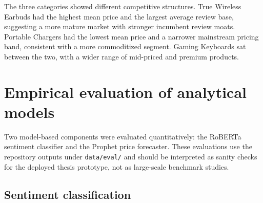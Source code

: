 \begin{table}[H]
  \centering
  \small
  \caption{Descriptive statistics of tracked categories on April 29, 2026. SOV denotes Sponsored Share of Voice, computed as the proportion of sponsored ASINs in the Top-50 snapshot. The uniform 4.0\% value across all three categories is a measurement artifact: the Apify actor flagged exactly two ASINs as sponsored in each Top-50 list ($2/50 = 4.0\%$), which likely under-counts true ad density because the actor captures only the labels visible on the first scrape pass.}
  \label{tab:category_baseline}
\end{table}

The three categories showed different competitive structures. True Wireless Earbuds had the highest mean price and the largest average review base, suggesting a more mature market with stronger incumbent review moats. Portable Chargers had the lowest mean price and a narrower mainstream pricing band, consistent with a more commoditized segment. Gaming Keyboards sat between the two, with a wider range of mid-priced and premium products.

\section{Empirical evaluation of analytical models}

Two model-based components were evaluated quantitatively: the RoBERTa sentiment classifier and the Prophet price forecaster. These evaluations use the repository outputs under \texttt{data/eval/} and should be interpreted as sanity checks for the deployed thesis prototype, not as large-scale benchmark studies.

\subsection{Sentiment classification}

